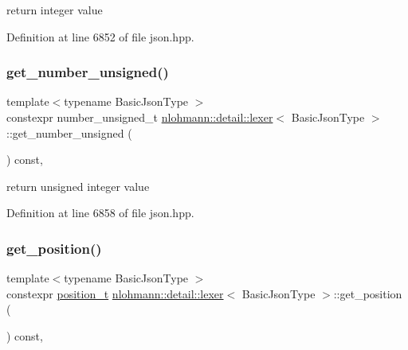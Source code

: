 return integer value 



Definition at line 6852 of file json.\+hpp.

\mbox{\label{classnlohmann_1_1detail_1_1lexer_a56640fb92293e0c17742ca3c814d74d6}} 
\subsubsection{\texorpdfstring{get\_number\_unsigned()}{get\_number\_unsigned()}}
{\footnotesize\ttfamily template$<$typename Basic\+Json\+Type $>$ \\
constexpr number\+\_\+unsigned\+\_\+t \mbox{\hyperlink{classnlohmann_1_1detail_1_1lexer}{nlohmann\+::detail\+::lexer}}$<$ Basic\+Json\+Type $>$\+::get\+\_\+number\+\_\+unsigned (\begin{DoxyParamCaption}{ }\end{DoxyParamCaption}) const\hspace{0.3cm}{\ttfamily [inline]}, {\ttfamily [noexcept]}}



return unsigned integer value 



Definition at line 6858 of file json.\+hpp.

\mbox{\label{classnlohmann_1_1detail_1_1lexer_abf5143501435f9f79898c1ff238c2622}} 
\subsubsection{\texorpdfstring{get\_position()}{get\_position()}}
{\footnotesize\ttfamily template$<$typename Basic\+Json\+Type $>$ \\
constexpr \mbox{\hyperlink{structnlohmann_1_1detail_1_1position__t}{position\+\_\+t}} \mbox{\hyperlink{classnlohmann_1_1detail_1_1lexer}{nlohmann\+::detail\+::lexer}}$<$ Basic\+Json\+Type $>$\+::get\+\_\+position (\begin{DoxyParamCaption}{ }\end{DoxyParamCaption}) const\hspace{0.3cm}{\ttfamily [inline]}, {\ttfamily [noexcept]}}



